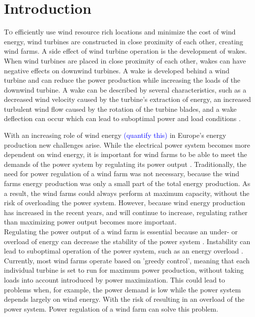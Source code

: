 \section{Introduction}
\lettrine[nindent=0em,lines=3]To efficiently use wind resource rich locations and minimize the cost of wind energy, wind turbines are constructed in close proximity of each other, creating wind farms. A side effect of wind turbine operation is the development of wakes. When wind turbines are placed in close proximity of each other, wakes can have negative effects on downwind turbines. A wake is developed behind a wind turbine and can reduce the power production while increasing the loads of the downwind turbine. A wake can be described by several characteristics, such as a decreased wind velocity caused by the turbine's extraction of energy, an increased turbulent wind flow caused by the rotation of the turbine blades, and a wake deflection can occur which can lead to suboptimal power and load conditions \cite{Boersma2017, Wilson2017, Dijk2016, Fleming2014, Zalkind2016}.

With an increasing role of wind energy \textcolor{blue}{(quantify this)} in Europe's energy production new challenges arise\cite{Nat2016}. While the electrical power system becomes more dependent on wind energy, it is important for wind farms to be able to meet the demands of the power system by regulating its power output \cite{Tande2003}. Traditionally, the need for power regulation of a wind farm was not necessary, because the wind farms energy production was only a small part of the total energy production. As a result, the wind farms could always perform at maximum capacity, without the risk of overloading the power system. However, because wind energy production has increased in the recent years, and will continue to increase, regulating rather than maximizing power output becomes more important.\\ 
\indent Regulating the power output of a wind farm is essential because an under- or overload of energy can decrease the stability of the power system \cite{Tande2003}. Instability can lead to suboptimal operation of the power system, such as an energy overload \cite{Tande2003, Hansen20}. Currently, most wind farms operate based on 'greedy control', meaning that each individual turbine is set to run for maximum power production, without taking loads into account introduced by power maximization. This could lead to problems when, for example, the power demand is low while the power system depends largely on wind energy. With the risk of resulting in an overload of the power system. Power regulation of a wind farm can solve this problem.


